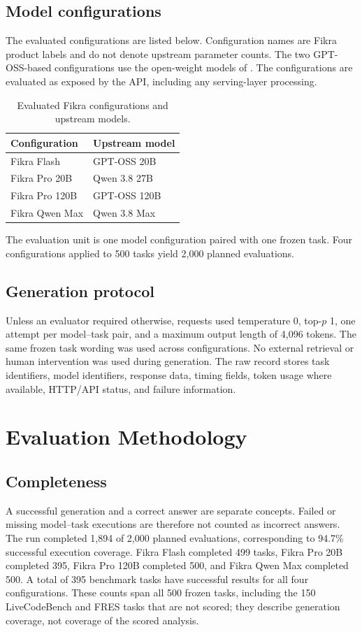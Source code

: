 \documentclass[11pt]{article}
\begin{document}
\subsection{Model configurations}
The evaluated configurations are listed below. Configuration names are Fikra product labels and do not denote upstream parameter counts. The two GPT-OSS-based configurations use the open-weight models of \cite{openai2025gptoss}. The configurations are evaluated as exposed by the API, including any serving-layer processing.
\begin{table}[t]
\centering
\caption{Evaluated Fikra configurations and upstream models.}
\label{tab:models}
\begin{tabular}{ll}
\toprule
Configuration & Upstream model \\
\midrule
Fikra Flash & GPT-OSS 20B \\
Fikra Pro 20B & Qwen 3.8 27B \\
Fikra Pro 120B & GPT-OSS 120B \\
Fikra Qwen Max & Qwen 3.8 Max \\
\bottomrule
\end{tabular}
\end{table}

The evaluation unit is one model configuration paired with one frozen task. Four configurations applied to 500 tasks yield 2,000 planned evaluations.

\subsection{Generation protocol}
Unless an evaluator required otherwise, requests used temperature 0, top-$p$ 1, one attempt per model--task pair, and a maximum output length of 4,096 tokens. The same frozen task wording was used across configurations. No external retrieval or human intervention was used during generation. The raw record stores task identifiers, model identifiers, response data, timing fields, token usage where available, HTTP/API status, and failure information.

\section{Evaluation Methodology}
\subsection{Completeness}
A successful generation and a correct answer are separate concepts. Failed or missing model--task executions are therefore not counted as incorrect answers. The run completed 1,894 of 2,000 planned evaluations, corresponding to 94.7\% successful execution coverage. Fikra Flash completed 499 tasks, Fikra Pro 20B completed 395, Fikra Pro 120B completed 500, and Fikra Qwen Max completed 500. A total of 395 benchmark tasks have successful results for all four configurations. These counts span all 500 frozen tasks, including the 150 LiveCodeBench and FRES tasks that are not scored; they describe generation coverage, not coverage of the scored analysis.
\end{document}
